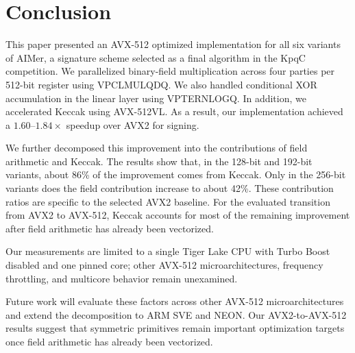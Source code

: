 \section{Conclusion}
\label{sec:conc}

This paper presented an AVX-512 optimized implementation for all six
variants of AIMer, a signature scheme selected as a final algorithm
in the KpqC competition. We parallelized binary-field multiplication across four parties per 512-bit register using VPCLMULQDQ. We also handled conditional XOR accumulation in the linear layer using VPTERNLOGQ. In addition, we accelerated Keccak using AVX-512VL. As a result, our implementation achieved a $1.60$--$1.84\times$ speedup over AVX2 for signing.

We further decomposed this improvement into the contributions of field arithmetic and Keccak. The results show that, in the 128-bit and 192-bit variants, about 86\% of the improvement comes from Keccak. Only in the 256-bit variants does the field contribution increase to about 42\%. These contribution ratios are specific to the selected AVX2 baseline. For the evaluated transition from AVX2 to AVX-512, Keccak accounts for most of the remaining improvement after field arithmetic has already been vectorized.

Our measurements are limited to a single Tiger Lake CPU with Turbo Boost disabled and one pinned core; other AVX-512 microarchitectures, frequency throttling, and multicore behavior remain unexamined.

Future work will evaluate these factors across other AVX-512
microarchitectures and extend the decomposition to ARM SVE and NEON. Our AVX2-to-AVX-512 results suggest that symmetric primitives remain important optimization targets once field arithmetic has already been vectorized.
